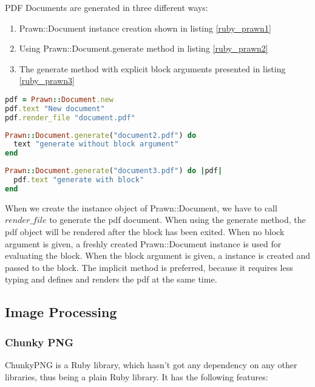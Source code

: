 PDF Documents are generated in three different ways:
\begin{enumerate}
  \item Prawn::Document instance creation shown in listing \ref{ruby_prawn1}
  \item Using Prawn::Document.generate method in listing \ref{ruby_prawn2}
  \item The generate method with explicit block arguments presented in listing \ref{ruby_prawn3}
\end{enumerate}

\begin{lstlisting}[language=Ruby, caption={Prawn Document generation with instance creation}, label=ruby_prawn1]
pdf = Prawn::Document.new
pdf.text "New document"
pdf.render_file "document.pdf"
\end{lstlisting}

\begin{lstlisting}[language=Ruby, caption={Prawn Document generation with method}, label=ruby_prawn2]
Prawn::Document.generate("document2.pdf") do 
  text "generate without block argument"
end
\end{lstlisting}

\begin{lstlisting}[language=Ruby, caption={Prawn Document generation with block argument}, label=ruby_prawn3]
Prawn::Document.generate("document3.pdf") do |pdf|
  pdf.text "generate with block"
end
\end{lstlisting}

When we create the instance object of Prawn::Document, we have to call $render\_file$ to generate the pdf document. 
When using the generate method, the pdf object will be rendered after the block has been exited. When no block argument is given, a freshly created Prawn::Document instance is used for evaluating the block. When the block argument is given, a instance is created and passed to the block. The implicit method is preferred, because it requires less typing and defines and renders the pdf at the same time. 


\subsection{Image Processing}

\subsubsection{Chunky PNG}

ChunkyPNG is a Ruby library, which hasn't got any dependency on any other libraries, thus being a plain Ruby library.
It has the following features:

